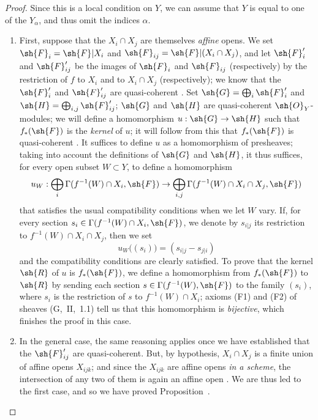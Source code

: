 \begin{proof}
Since this is a local condition on $Y$, we can assume that $Y$ is equal to one
of the $Y_\alpha$, and thus omit the indices $\alpha$.
\begin{enumerate}
  \item[(a)] First, suppose that the $X_i\cap X_j$
    are themselves \emph{affine} opens. We set $\sh{F}_i=\sh{F}|X_i$ and
    $\sh{F}_{ij}=\sh{F}|(X_i\cap X_j)$, and let $\sh{F}'_i$ and
    $\sh{F}'_{ij}$ be the images of $\sh{F}_i$ and $\sh{F}_{ij}$
    (respectively) by the restriction of $f$ to $X_i$ and to $X_i\cap X_j$
    (respectively); we know that the $\sh{F}'_i$ and $\sh{F}'_{ij}$ are
    quasi-coherent . Set $\sh{G}=\bigoplus_i\sh{F}'_i$ and
    $\sh{H}=\bigoplus_{i,j}\sh{F}'_{ij}$; $\sh{G}$ and $\sh{H}$ are
    quasi-coherent $\sh{O}_Y$-modules; we will define a homomorphism
    $u:\sh{G}\to\sh{H}$ such that $f_*(\sh{F})$ is the
    \emph{kernel} of $u$; it will follow from this that $f_*(\sh{F})$ is
    quasi-coherent . It suffices to define $u$ as
    a homomorphism of presheaves; taking into account the definitions of $\sh{G}$
    and $\sh{H}$, it thus suffices, for every open subset $W\subset Y$, to define a
    homomorphism
    \[
      u_W:\bigoplus_i\Gamma(f^{-1}(W)\cap X_i,\sh{F})\to\bigoplus_{i,j}\Gamma(f^{-1}(W)\cap X_i\cap X_j,\sh{F})
    \]
    that satisfies the usual compatibility conditions when we let $W$ vary.
    If, for every section $s_i\in\Gamma(f^{-1}(W)\cap X_i,\sh{F})$, we denote by $s_{i|j}$ its restriction to $f^{-1}(W)\cap X_i\cap X_j$, then we set
    \[
      u_W\big((s_i)\big)=(s_{i|j}-s_{j|i})
    \]
    and the compatibility conditions are clearly satisfied.
    To prove that the kernel $\sh{R}$ of $u$ is $f_*(\sh{F})$, we define a homomorphism from $f_*(\sh{F})$ to $\sh{R}$ by sending each section $s\in\Gamma(f^{-1}(W),\sh{F})$ to the family $(s_i)$, where $s_i$ is the restriction of $s$ to $f^{-1}(W)\cap X_i$; axioms (F1) and (F2) of sheaves (G,~II,~1.1) tell us that this homomorphism is \emph{bijective}, which finishes the proof in this case.
  \item[(b)] In the general case, the same reasoning applies once we have established that the $\sh{F}'_{ij}$ are quasi-coherent.
    But, by hypothesis, $X_i\cap X_j$ is a finite union of affine opens $X_{ijk}$; and since the $X_{ijk}$ are affine opens \emph{in a scheme}, the intersection of any two of them is again an affine open . We are thus led to the first case, and so we have proved Proposition~.
\end{enumerate}
\end{proof}

